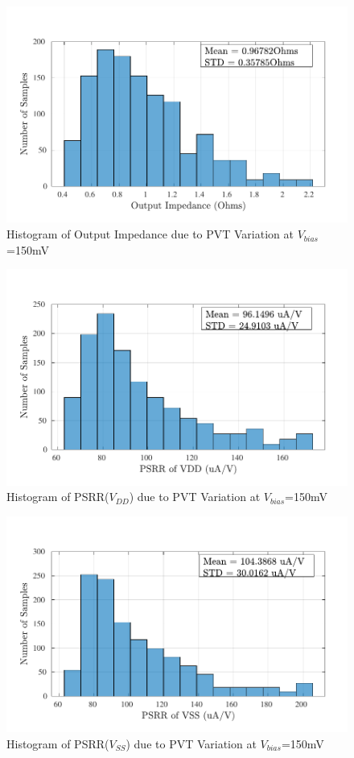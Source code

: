 \begin{figure} [H]
\centering
\includegraphics[scale=1]{Figures/Corners/Overall/PVT_Min/PDFs/PVT_Min_zout.pdf}
\caption{Histogram of Output Impedance due to PVT Variation at $V_{bias}$=150mV}
\end{figure}

\begin{figure} [H]
\centering
\includegraphics[scale=1]{Figures/Corners/Overall/PVT_Min/PDFs/PVT_Min_psrrp.pdf}
\caption{Histogram of PSRR($V_{DD}$) due to PVT Variation at $V_{bias}$=150mV}
\end{figure}

\begin{figure} [H]
\centering
\includegraphics[scale=1]{Figures/Corners/Overall/PVT_Min/PDFs/PVT_Min_psrrn.pdf}
\caption{Histogram of PSRR($V_{SS}$) due to PVT Variation at $V_{bias}$=150mV}
\end{figure}

